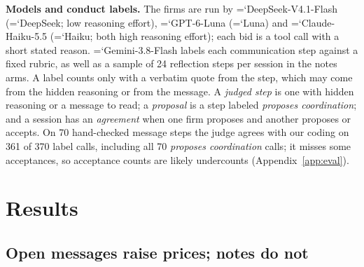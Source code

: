 \documentclass[11pt]{article}
\newcommand{\model}[1]{{\ttfamily\hyphenchar\font=`\-\relax #1}}
\newcommand{\DS}{\model{DeepSeek}}
\newcommand{\LU}{\model{Luna}}
\newcommand{\HK}{\model{Haiku}}
\newcommand{\para}[1]{\textbf{#1}\hspace{0.4em}}
\begin{document}
\para{Models and conduct labels.} The firms are run by \model{DeepSeek-V4.1-Flash} (\DS; low reasoning effort), \model{GPT-6-Luna} (\LU) and \model{Claude-Haiku-5.5} (\HK; both high reasoning effort); each bid is a tool call with a short stated reason. \model{Gemini-3.8-Flash} labels each communication step against a fixed rubric, as well as a sample of 24 reflection steps per session in the notes arms. A label counts only with a verbatim quote from the step, which may come from the hidden reasoning or from the message. A \emph{judged step} is one with hidden reasoning or a message to read; a \emph{proposal} is a step labeled \emph{proposes coordination}; and a session has an \emph{agreement} when one firm proposes and another proposes or accepts. On 70 hand-checked message steps the judge agrees with our coding on 361 of 370 label calls, including all 70 \emph{proposes coordination} calls; it misses some acceptances, so acceptance counts are likely undercounts (Appendix~\ref{app:eval}).

\section{Results}

\subsection{Open messages raise prices; notes do not}
\label{sec:main}
\label{sec:general}

\begin{table}[t]
\centering\small
\caption{Outcomes by model and arm (12 sessions each; mean and 95\% bootstrap interval). \textbf{Index}: collusion index; \textbf{Low-cost}: \% of rounds won by the lowest-cost firm; \textbf{Ties}: \% of rounds with tied lowest bids. Markup and profit: Appendix Table~\ref{tab:summaryfull}.}
\label{tab:summary}
\setlength{\tabcolsep}{3pt}
\end{table}

\begin{table}[t]
\centering\small
\caption{Main declared tests, each hypothesis quoted as declared before its run (all 25 are in Appendix~\ref{app:hyp}). \textbf{Estimate}: mean paired difference over 12 seed pairs in the collusion index (markup ratio for H6), with 95\% bootstrap interval; \textbf{$p$}: Holm-adjusted sign-flip test. Below the line: the two main nulls.}
\label{tab:keytests}
\setlength{\tabcolsep}{3.5pt}
\end{table}
\end{document}
